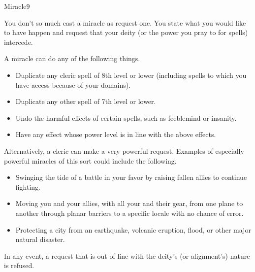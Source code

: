 \begin{spellsection}{Miracle}{9}
    \begin{spellheader}
    \end{spellheader}
    \begin{spellcontent}
        \begin{spelltargetinginfo}
        \end{spelltargetinginfo}
        \begin{spelleffects}
            \spelleffect You don't so much cast a miracle as request one. You state what you would like to have happen and request that your deity (or the power you pray to for spells) intercede.
            \par A miracle can do any of the following things.
            \begin{itemize}
                \item Duplicate any cleric spell of 8th level or lower (including spells to which you have access because of your domains).
                \item Duplicate any other spell of 7th level or lower.
                \item Undo the harmful effects of certain spells, such as feeblemind or insanity.
                \item Have any effect whose power level is in line with the above effects.
            \end{itemize}
            \par Alternatively, a cleric can make a very powerful request. Examples of especially powerful miracles of this sort could include the following.
            \begin{itemize}
                \item Swinging the tide of a battle in your favor by raising fallen allies to continue fighting.
                \item Moving you and your allies, with all your and their gear, from one plane to another through planar barriers to a specific locale with no chance of error.
                \item Protecting a city from an earthquake, volcanic eruption, flood, or other major natural disaster.
            \end{itemize}
            \par In any event, a request that is out of line with the deity's (or alignment's) nature is refused.

\end{spelleffects}
\end{spellcontent}
\end{spellsection}
